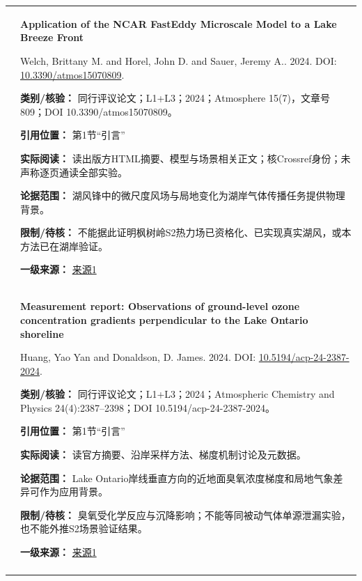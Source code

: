 \begin{longtable}{@{}>{\raggedright\arraybackslash}p{0.7cm}>{\raggedright\arraybackslash}p{14.8cm}@{}}
3 & \textbf{Application of the NCAR FastEddy Microscale Model to a Lake Breeze Front}\par Welch, Brittany M. and Horel, John D. and Sauer, Jeremy A.. 2024. DOI: \url{10.3390/atmos15070809}. \par\textbf{类别/核验：} 同行评议论文；L1+L3；2024；Atmosphere 15(7)，文章号809；DOI 10.3390/atmos15070809。\par\textbf{引用位置：} 第1节“引言”\par\textbf{实际阅读：} 读出版方HTML摘要、模型与场景相关正文；核Crossref身份；未声称逐页通读全部实验。\par\textbf{论据范围：} 湖风锋中的微尺度风场与局地变化为湖岸气体传播任务提供物理背景。\par\textbf{限制/待核：} 不能据此证明枫树岭S2热力场已资格化、已实现真实湖风，或本方法已在湖岸验证。\par\textbf{一级来源：} \href{https://www.mdpi.com/2073-4433/15/7/809}{来源1} \\\addlinespace[6pt]
4 & \textbf{Measurement report: Observations of ground-level ozone concentration gradients perpendicular to the Lake Ontario shoreline}\par Huang, Yao Yan and Donaldson, D. James. 2024. DOI: \url{10.5194/acp-24-2387-2024}. \par\textbf{类别/核验：} 同行评议论文；L1+L3；2024；Atmospheric Chemistry and Physics 24(4):2387–2398；DOI 10.5194/acp-24-2387-2024。\par\textbf{引用位置：} 第1节“引言”\par\textbf{实际阅读：} 读官方摘要、沿岸采样方法、梯度机制讨论及元数据。\par\textbf{论据范围：} Lake Ontario岸线垂直方向的近地面臭氧浓度梯度和局地气象差异可作为应用背景。\par\textbf{限制/待核：} 臭氧受化学反应与沉降影响；不能等同被动气体单源泄漏实验，也不能外推S2场景验证结果。\par\textbf{一级来源：} \href{https://acp.copernicus.org/articles/24/2387/2024/acp-24-2387-2024.html}{来源1} \\\addlinespace[6pt]

\end{longtable}
